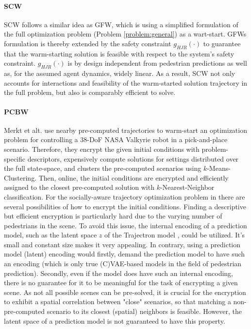 \paragraph{\ac{SCW}} 
SCW follows a similar idea as \ac{GFW}, which is using a simplified formulation of the full optimization problem (Problem \ref{problem:general}) as a wart-start. \ac{GFW}s formulation is thereby extended by the safety constraint $g_{HJR}(\cdot)$ to guarantee that the warm-starting solution is feasible with respect to the system's safety constraint. $g_{HJR}(\cdot)$ is by design independent from pedestrian predictions as well as, for the assumed agent dynamics, widely linear. As a result, \ac{SCW} not only accounts for interactions and feasibility of the warm-started solution trajectory in the full problem, but also is comparably efficient to solve.  

\paragraph{\ac{PCBW}}
Merkt et alt. \cite{Merkt2018} use nearby pre-computed trajectories to warm-start an optimization problem for controlling a 38-DoF NASA Valkyrie robot in a pick-and-place scenario. Therefore, they encrypt the given initial conditions with problem-specific descriptors, expensively compute solutions for settings distributed over the full state-space, and clusters the pre-computed scenarios using $k$-Means-Clustering. Then, online, the initial conditions are encrypted and efficiently assigned to the closest pre-computed solution with $k$-Nearest-Neighbor classification. 
\newline
For the socially-aware trajectory optimization problem in \project there are several possibilities of how to encrypt the initial conditions. Finding a descriptive but efficient encryption is particularly hard due to the varying number of pedestrians in the scene. To avoid this issue, the internal encoding of a prediction model, such as the latent space $z$ of the Trajectron model \cite{Ivanovic2018}, could be utilized. It's small and constant size makes it very appealing. In contrary, using a prediction model (latent) encoding would firstly, demand the prediction model to have such an encoding (which is only true (C)\ac{VAE}-based models in the field of  pedestrian prediction). Secondly, even if the model does have such an internal encoding, there is no guarantee for it to be meaningful for the task of encrypting a given scene. As not all possible scenes can be pre-solved, it is crucial for the encryption to exhibit a spatial correlation between "close" scenarios, so that matching a non-pre-computed scenario to its closest (spatial) neighbors is feasible. However, the latent space of a prediction model is not guaranteed to have this property. 

